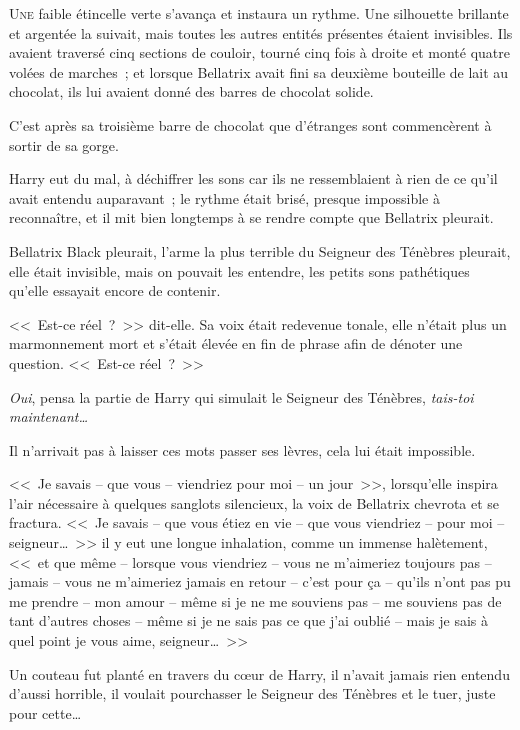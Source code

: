 
\lettrine{U}{ne} faible étincelle verte s'avança et instaura un rythme. Une silhouette brillante et argentée la suivait, mais toutes les autres entités présentes étaient invisibles. Ils avaient traversé cinq sections de couloir, tourné cinq fois à droite et monté quatre volées de marches~; et lorsque Bellatrix avait fini sa deuxième bouteille de lait au chocolat, ils lui avaient donné des barres de chocolat solide.

C'est après sa troisième barre de chocolat que d'étranges sont commencèrent à sortir de sa gorge.

Harry eut du mal, à déchiffrer les sons car ils ne ressemblaient à rien de ce qu'il avait entendu auparavant~; le rythme était brisé, presque impossible à reconnaître, et il mit bien longtemps à se rendre compte que Bellatrix pleurait.

Bellatrix Black pleurait, l'arme la plus terrible du Seigneur des Ténèbres pleurait, elle était invisible, mais on pouvait les entendre, les petits sons pathétiques qu'elle essayait encore de contenir.

<<~Est-ce réel~?~>> dit-elle. Sa voix était redevenue tonale, elle n'était plus un marmonnement mort et s'était élevée en fin de phrase afin de dénoter une question. <<~Est-ce réel~?~>>

\emph{Oui}, pensa la partie de Harry qui simulait le Seigneur des Ténèbres, \emph{tais-toi maintenant…}

Il n'arrivait pas à laisser ces mots passer ses lèvres, cela lui était impossible.

<<~Je savais -- que vous -- viendriez pour moi -- un jour~>>, lorsqu'elle inspira l'air nécessaire à quelques sanglots silencieux, la voix de Bellatrix chevrota et se fractura. <<~Je savais -- que vous étiez en vie -- que vous viendriez -- pour moi -- seigneur…~>> il y eut une longue inhalation, comme un immense halètement, <<~et que même -- lorsque vous viendriez -- vous ne m'aimeriez toujours pas -- jamais -- vous ne m'aimeriez jamais en retour -- c'est pour ça -- qu'ils n'ont pas pu me prendre -- mon amour -- même si je ne me souviens pas -- me souviens pas de tant d'autres choses -- même si je ne sais pas ce que j'ai oublié -- mais je sais à quel point je vous aime, seigneur…~>>

Un couteau fut planté en travers du cœur de Harry, il n'avait jamais rien entendu d'aussi horrible, il voulait pourchasser le Seigneur des Ténèbres et le tuer, juste pour cette…

